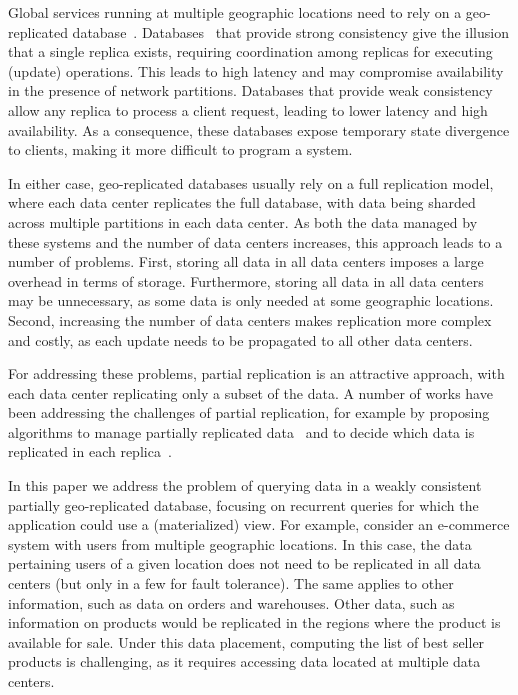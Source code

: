 \documentclass[sigplan,review,anonymous]{acmart}
\begin{document}

Global services running at multiple geographic locations need 
to rely on a geo-replicated database~\cite{dynamo}.
Databases~\cite{spanner,cockroachdb,mdcc} that provide strong consistency give the illusion that 
a single replica exists, requiring coordination among
replicas for executing (update) operations. This leads to high latency and may compromise 
availability in the presence of network partitions.
Databases that provide weak consistency~\cite{eventual,dynamo,cops} allow any replica to process a
client request, leading to lower latency and high availability. As a consequence, these databases expose
temporary state divergence to clients, making it more difficult to program a system. 

In either case, geo-replicated databases usually rely on a full replication model, where each data 
center replicates the full database, with data being sharded across multiple partitions in each data 
center. 
As both the data managed by these systems and the number of data centers increases,
this approach leads to a number of problems.
First, storing all data in all data centers imposes a large overhead in terms of storage. 
Furthermore, storing all data in all data centers may be unnecessary, as some data is only needed at some
geographic locations.
Second, increasing the number of data centers makes replication 
more complex and costly, 
as each update needs to be propagated to all other data centers.

For addressing these problems, partial replication is an attractive approach, with each data center
replicating only a subset of the data.
A number of works have been addressing the challenges of 
partial replication, for example by proposing algorithms to manage partially 
replicated data~\cite{spanner,saturn,sipre, practi} and to decide which data is replicated in each replica~\cite{slog, sipre}.

In this paper we address the problem of querying data in a weakly consistent partially geo-replicated database, 
focusing on recurrent queries for which the application could use a (materialized) view.
For example, consider an e-commerce system with users from multiple geographic locations.
In this case, the data pertaining users of a given location does not need to be replicated in all data centers
(but only in a few for fault tolerance). The same applies to other information, such as data on orders and 
warehouses.
Other data, such as information on products would be replicated in the regions where the product
is available for sale.  
Under this data placement, computing the list of best seller products is challenging, as it requires
accessing data located at multiple data centers.
\end{document}
